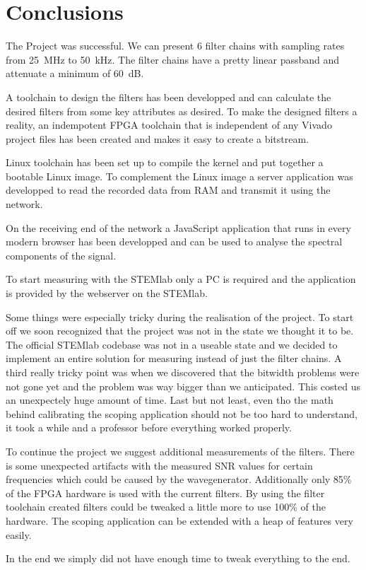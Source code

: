 \chapter{Conclusions}
\label{ch:conclusions}

The Project was successful. We can present 6 filter chains with sampling rates from \SI{25}{\mega\Hz} to \SI{50}{\kilo\Hz}. The filter chains have a pretty linear passband and attenuate a minimum of \SI{60}{\dB}.

A toolchain to design the filters has been developped and can calculate the desired filters from some key attributes as desired.
To make the designed filters a reality, an indempotent FPGA toolchain that is independent of any Vivado project files has been created and makes it easy to create a bitstream.

Linux toolchain has been set up to compile the kernel and put together a bootable Linux image. To complement the Linux image a server application was developped to read the recorded data from RAM and transmit it using the network.

On the receiving end of the network a JavaScript application that runs in every modern browser has been developped and can be used to analyse the spectral components of the signal.

To start measuring with the STEMlab only a PC is required and the application is provided by the webserver on the STEMlab.


Some things were especially tricky during the realisation of the project.
To start off we soon recognized that the project was not in the state we thought it to be. The official STEMlab codebase was not in a useable state and we decided to implement an entire solution for measuring instead of just the filter chains.
A third really tricky point was when we discovered that the bitwidth problems were not gone yet and the problem was way bigger than we anticipated. This costed us an unexpectely huge amount of time.
Last but not least, even tho the math behind calibrating the scoping application should not be too hard to understand, it took a while and a professor before everything worked properly.


To continue the project we suggest additional measurements of the filters. There is some unexpected artifacts with the measured SNR values for certain frequencies which could be caused by the wavegenerator.
Additionally only 85\% of the FPGA hardware is used with the current filters. By using the filter toolchain created filters could be tweaked a little more to use 100\% of the hardware.
The scoping application can be extended with a heap of features very easily.

In the end we simply did not have enough time to tweak everything to the end.